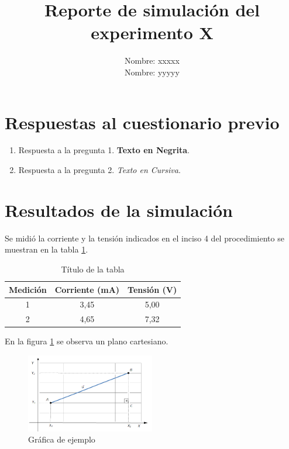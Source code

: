 \documentclass[letter]{article}
\title{Reporte de simulación del experimento X}
\author{Nombre: xxxxx \\
        Nombre: yyyyy \\
}
\begin{document}
\renewcommand{\tablename}{Tabla} 
\maketitle

\section{Respuestas al cuestionario previo}

\begin{enumerate}

    \item Respuesta a la pregunta 1. \textbf{Texto en Negrita}.
    
    \item Respuesta a la pregunta 2. \textit{Texto en Cursiva}.
    
\end{enumerate}

\section{Resultados de la simulación}

Se midió la corriente y la tensión indicados en el inciso 4 del procedimiento se muestran en la tabla \ref{tab:medicion_I_V}.

\begin{table} [ht]
    \centering
    \caption{Título de la tabla}
    \label{tab:medicion_I_V}
    \begin{tabular}{|c|c|c|}
        \hline 
        Medición & Corriente (mA) & Tensión (V) \\ 
        \hline 
        1  & 3,45 & 5,00 \\ 
        \hline 
        2 & 4,65 & 7,32 \\ 
        \hline 
    \end{tabular} 
\end{table}

En la figura \ref{fig:graf} se observa un plano cartesiano.

\begin{figure}[htb]
    \centering
    \includegraphics[width=0.5\textwidth]{Plano_cartesiano.png}
    \caption{Gráfica de ejemplo}
    \label{fig:graf}
\end{figure} 
\end{document}

